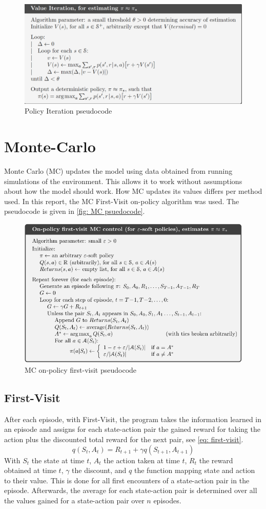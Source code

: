 \documentclass{class}
\begin{document}
\begin{figure}[H]
    \centering
    \includegraphics[width=0.5\linewidth]{images/value_iteration.png}
    \caption{Policy Iteration pseudocode \parencite[p. 80]{sutton-2018}}
    \label{fig:value_iteration_pseudocode}
\end{figure}
\section{Monte-Carlo}

\label{sec: monte-carlo}
Monte Carlo (MC) updates the model using data obtained from running simulations of the environment. This allows it to work without assumptions about how the model should work. How MC updates its values differs per method used. In this report, the MC First-Visit on-policy algorithm was used. The pseudocode is given in \autoref{fig: MC psuedocode}.
\begin{figure}[H]
    \centering
    \includegraphics[width=0.5\linewidth]{report_src/images/mc_on_policy_first_visit.png}
    \caption{MC on-policy first-visit pseudocode \parencite[p. 101]{sutton-2018}}
    \label{fig: MC psuedocode}
\end{figure}

\subsection{First-Visit}
After each episode, with First-Visit, the program takes the information learned in an episode and assigns for each state-action pair the gained reward for taking the action plus the discounted total reward for the next pair, see \autoref{eq: first-visit}.
\begin{equation}
    \label{eq: first-visit}
    q(S_t,A_t) = R_{t+1}+\gamma q(S_{t+1},A_{t+1})
\end{equation}
With $S_t$ the state at time $t$, $A_t$ the action taken at time $t$, $R_t$ the reward obtained at time $t$, $\gamma$ the discount, and $q$ the function mapping state and action to their value. This is done for all first encounters of a state-action pair in the episode. Afterwards, the average for each state-action pair is determined over all the values gained for a state-action pair over $n$ episodes.
\end{document}
